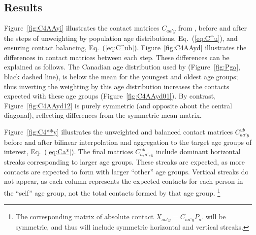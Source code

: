 \subsection{Results}\label{ex:results}
Figure~\ref{fig:C4AAyi} illustrates the contact matrices $C_{aa'y}$ from \citet{Prem2017},
before and after the steps of unweighting by population age distributions, Eq.~(\ref{eq:C^u}),
and ensuring contact balancing, Eq.~(\ref{eq:C^ub}).
Figure~\ref{fig:C4AAyd} illustrates the differences in contact matrices between each step.
These differences can be explained as follows.
The Canadian age distribution used by \citet{Prem2017} (Figure~\ref{fig:Pga}, black dashed line),
is below the mean for the youngest and oldest age groups;
thus inverting the weighting by this age distribution
increases the contacts expected with these age groups (Figure~\ref{fig:C4AAyd01}).
By contrast, Figure~\ref{fig:C4AAyd12} is purely symmetric (and opposite about the central diagonal),
reflecting differences from the symmetric mean matrix.
\par
Figure~\ref{fig:C4**y} illustrates the unweighted and balanced contact matrices $C^{ub}_{aa'y}$
before and after bilinear interpolation and aggregation to the target age groups of interest, Eq.~(\ref{eq:Ca*}).
The final matrices $C^{ub}_{a_*a'_*y}$ include dominant horizontal streaks corresponding to larger age groups.
These streaks are expected, as more contacts are expected to form with larger ``other'' age groups.
Vertical streaks do not appear, as each column represents
the expected contacts for each person in the ``self'' age group,
not the total contacts formed by that age group.%
\footnote{The corresponding matrix of absolute contact $X_{aa'y} = C_{aa'y} P_{a'}$
  will be symmetric, and thus will include symmetric horizontal and vertical streaks.}
